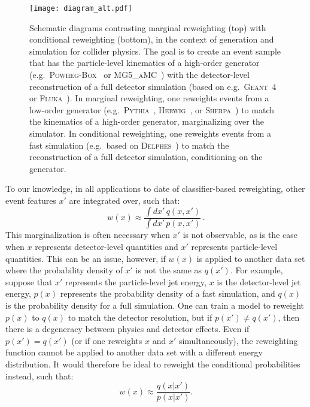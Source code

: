 \documentclass[aps,prx,reprint,preprintnumbers,superscriptaddress,nofootinbib,longbibliography,floatfix]{revtex4-2}
\begin{document}
\begin{figure*}
    \centering
    \texttt{[image: diagram\_alt.pdf]}
    \caption{
    Schematic diagrams contrasting marginal reweighting (top) with conditional reweighting (bottom), in the context of generation and simulation for collider physics.
    The goal is to create an event sample that has the particle-level kinematics of a high-order generator (e.g.\ \textsc{Powheg-Box}~\cite{Alioli:2010xd,Nason:2004rx,Frixione:2007vw} or \textsc{MG5\_aMC}~\cite{Alwall:2014hca}) with the detector-level reconstruction of a full detector simulation (based on e.g.\ \textsc{Geant}~4~\cite{Agostinelli:2002hh,1610988,Allison:2016lfl} or \textsc{Fluka}~\cite{Battistoni:2015epi,BOHLEN2014211}).
    In marginal reweighting, one reweights events from a low-order generator (e.g.\ \textsc{Pythia}~\cite{Sjostrand:2006za,Sjostrand:2014zea}, \textsc{Herwig}~\cite{Bahr:2008pv,Bellm:2015jjp}, or \textsc{Sherpa}~\cite{Gleisberg:2008ta,Sherpa:2019gpd}) to match the kinematics of a high-order generator, marginalizing over the simulator.
    In conditional reweighting, one reweights events from a fast simulation (e.g.\ based on \textsc{Delphes}~\cite{deFavereau:2013fsa,Mertens:2015kba,Selvaggi:2014mya}) to match the reconstruction of a full detector simulation, conditioning on the generator.
    }
    \label{fig:schematic}
\end{figure*}

To our knowledge, in all applications to date of classifier-based reweighting, other event features $x'$ are integrated over, such that:
%
\begin{equation}
    w(x)\approx \frac{\int dx'\, q(x,x')}{\int dx' \, p(x,x')}\,.
\end{equation}
%
This marginalization is often necessary when $x'$ is not observable, as is the case when $x$ represents detector-level quantities and $x'$ represents particle-level quantities.
%
This can be an issue, however, if $w(x)$ is applied to another data set where the probability density of $x'$ is not the same as $q(x')$.
%
For example, suppose that $x'$ represents the particle-level jet energy, $x$ is the detector-level jet energy, $p(x)$ represents the probability density of a fast simulation, and $q(x)$ is the probability density for a full simulation.
%
One can train a model to reweight $p(x)$ to $q(x)$ to match the detector resolution, but if $p(x')\neq q(x')$, then there is a degeneracy between physics and detector effects.
%
Even if $p(x')=q(x')$ (or if one reweights $x$ and $x'$ simultaneously), the reweighting function cannot be applied to another data set with a different energy distribution.
%
It would therefore be ideal to reweight the conditional probabilities instead, such that:
%
\begin{equation}
\label{eq:cond_reweight}
    w(x)\approx \frac{q(x|x')}{p(x|x')}.
\end{equation}
\end{document}
